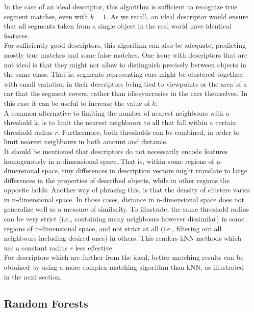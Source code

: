 In the case of an ideal descriptor, this algorithm is sufficient to recognize true segment matches, even with $k = 1$. As we recall, an ideal descriptor would ensure that all segments taken from a single object in the real world have identical features.\\ 

For sufficiently good descriptors, this algorithm can also be adequate, predicting mostly true matches and some false matches. One issue with descriptors that are not ideal is that they might not allow to distinguish precisely between objects in the same class.  
That is, segments representing cars might be clustered together, with small variation in their descriptors being tied to viewpoints or the area of a car that the segment covers, rather than idiosyncrasies in the cars themselves. In this case it can be useful to increase the value of $k$.\\

A common alternative to limiting the number of nearest neighbours with a threshold k, is to limit the nearest neighbours to all that fall within a certain threshold radius $r$. Furthermore, both thresholds can be combined, in order to limit nearest neighbours in both amount and distance.\\

It should be mentioned that descriptors do not necessarily encode features homogenously in n-dimensional space. That is, within some regions of n-dimensional space, tiny differences in description vectors might translate to large differences in the properties of described objects, while in other regions the opposite holds. Another way of phrasing this, is that the density of clusters varies in n-dimensional space. In those cases, distance in n-dimensional space does not generalize well as a measure of similarity. To illustrate, the same threshold radius can be very strict (i.e., containing many neighbours however dissimilar) in some regions of n-dimensional space, and not strict at all (i.e., filtering out all neighbours including desired ones) in others. This renders kNN methods which use a constant radius $r$ less effective.\\

For descriptors which are further from the ideal, better matching results can be obtained by using a more complex matching algorithm than kNN, as illustrated in the next section.

\subsection{Random Forests}
\label{subsec:RF}


